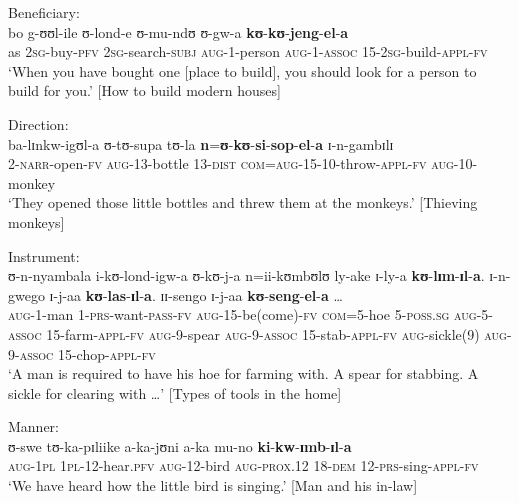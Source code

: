 \begin{exe}
\ex\label{exApplicativeBeneficient1}Beneficiary:\\
\gll bo g-ʊʊl-ile ʊ-lond-e ʊ-mu-ndʊ ʊ-gw-a \textbf{kʊ}-\textbf{kʊ}-\textbf{jeng}-\textbf{el}-\textbf{a}\\
as \textsc{2sg}-buy-\textsc{pfv} \textsc{2sg}-search-\textsc{subj} \textsc{aug}-1-person \textsc{aug}-1-\textsc{assoc} 15-\textsc{2sg}-build-\textsc{appl}-\textsc{fv}\\
\glt \lq When you have bought one [place to build], you should look for a person to build for you.' [How to build modern houses]

\ex\label{exApplicativeDirection}Direction:\\
\gll ba-lɪnkw-igʊl-a ʊ-tʊ-supa tʊ-la \textbf{n}=\textbf{ʊ}-\textbf{kʊ}-\textbf{si}-\textbf{sop}-\textbf{el}-\textbf{a} ɪ-n-gambɪlɪ\\
2-\textsc{narr}-open-\textsc{fv} \textsc{aug}-13-bottle 13-\textsc{dist} \textsc{com}=\textsc{aug}-15-10-throw-\textsc{appl}-\textsc{fv} \textsc{aug}-10-monkey\\
\glt \lq They opened those little bottles and threw them at the monkeys.' [Thieving monkeys]

\ex \label{exApplicativeInstrument1} Instrument:\\
\gll ʊ-n-nyambala i-kʊ-lond-igw-a ʊ-kʊ-j-a n=ii-kʊmbʊlʊ ly-ake ɪ-ly-a \textbf{kʊ}-\textbf{lɪm}-\textbf{ɪl}-\textbf{a}. ɪ-n-gwego ɪ-j-aa \textbf{kʊ}-\textbf{las}-\textbf{ɪl}-\textbf{a}. ɪɪ-sengo ɪ-j-aa \textbf{kʊ}-\textbf{seng}-\textbf{el}-\textbf{a} \ldots\\
\textsc{aug}-1-man 1-\textsc{prs}-want-\textsc{pass}-\textsc{fv} \textsc{aug}-15-be(come)-\textsc{fv} \textsc{com}=5-hoe 5-\textsc{poss.sg} \textsc{aug}-5-\textsc{assoc} 15-farm-\textsc{appl}-\textsc{fv} \textsc{aug}-9-spear \textsc{aug}-9-\textsc{assoc} 15-stab-\textsc{appl}-\textsc{fv} \textsc{aug}-sickle(9) \textsc{aug}-9-\textsc{assoc} 15-chop-\textsc{appl}-\textsc{fv}\\
\glt \lq A man is required to have his hoe for farming with. A spear for stabbing. A sickle for clearing with \ldots' [Types of tools in the home]

\ex \label{exApplicativeManner1} Manner:\footnotemark\\
\gll ʊ-swe tʊ-ka-pɪliike a-ka-jʊni a-ka mu-no \textbf{ki}-\textbf{kw}-\textbf{ɪmb}-\textbf{ɪl}-\textbf{a}\\
\textsc{aug}-\textsc{1pl} \textsc{1pl}-12-hear.\textsc{pfv} \textsc{aug}-12-bird \textsc{aug}-\textsc{prox.12} 18-\textsc{dem} 12-\textsc{prs}-sing-\textsc{appl}-\textsc{fv}\\
\glt \lq We have heard how the little bird is singing.' [Man and his in-law]


\end{exe}
